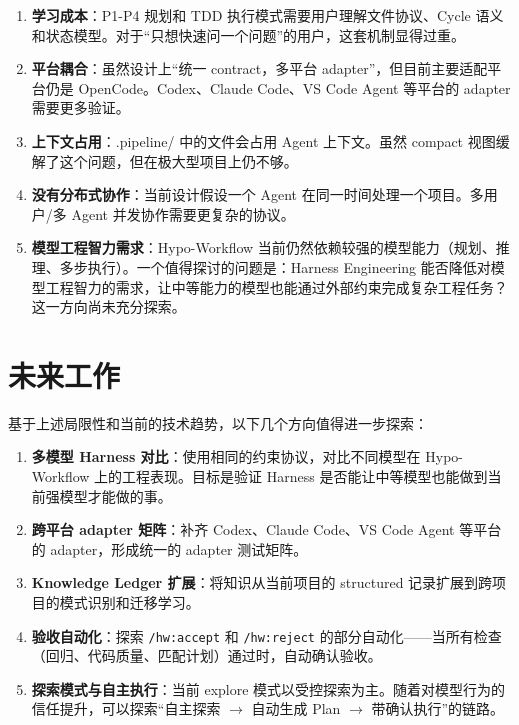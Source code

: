 \documentclass[
  outputdir=build,
  chapterstyle=cn,
  colorscheme=Simple,
  fontset=tech,
  code=false
]{Hypo-Note}
\begin{document}
\begin{enumerate}[leftmargin=2em]
  \item \textbf{学习成本}：P1-P4 规划和 TDD 执行模式需要用户理解文件协议、Cycle 语义和状态模型。对于“只想快速问一个问题”的用户，这套机制显得过重。
  \item \textbf{平台耦合}：虽然设计上“统一 contract，多平台 adapter”，但目前主要适配平台仍是 OpenCode。Codex、Claude Code、VS Code Agent 等平台的 adapter 需要更多验证。
  \item \textbf{上下文占用}：.pipeline/ 中的文件会占用 Agent 上下文。虽然 compact 视图缓解了这个问题，但在极大型项目上仍不够。
  \item \textbf{没有分布式协作}：当前设计假设一个 Agent 在同一时间处理一个项目。多用户/多 Agent 并发协作需要更复杂的协议。
  \item \textbf{模型工程智力需求}：Hypo-Workflow 当前仍然依赖较强的模型能力（规划、推理、多步执行）。一个值得探讨的问题是：Harness Engineering 能否降低对模型工程智力的需求，让中等能力的模型也能通过外部约束完成复杂工程任务？这一方向尚未充分探索。
\end{enumerate}

\section{未来工作}

基于上述局限性和当前的技术趋势，以下几个方向值得进一步探索：

\begin{enumerate}[leftmargin=2em]
  \item \textbf{多模型 Harness 对比}：使用相同的约束协议，对比不同模型在 Hypo-Workflow 上的工程表现。目标是验证 Harness 是否能让中等模型也能做到当前强模型才能做的事。
  \item \textbf{跨平台 adapter 矩阵}：补齐 Codex、Claude Code、VS Code Agent 等平台的 adapter，形成统一的 adapter 测试矩阵。
  \item \textbf{Knowledge Ledger 扩展}：将知识从当前项目的 structured 记录扩展到跨项目的模式识别和迁移学习。
  \item \textbf{验收自动化}：探索 \texttt{/hw:accept} 和 \texttt{/hw:reject} 的部分自动化——当所有检查（回归、代码质量、匹配计划）通过时，自动确认验收。
  \item \textbf{探索模式与自主执行}：当前 explore 模式以受控探索为主。随着对模型行为的信任提升，可以探索“自主探索 $\rightarrow$ 自动生成 Plan $\rightarrow$ 带确认执行”的链路。
\end{enumerate}
\end{document}
